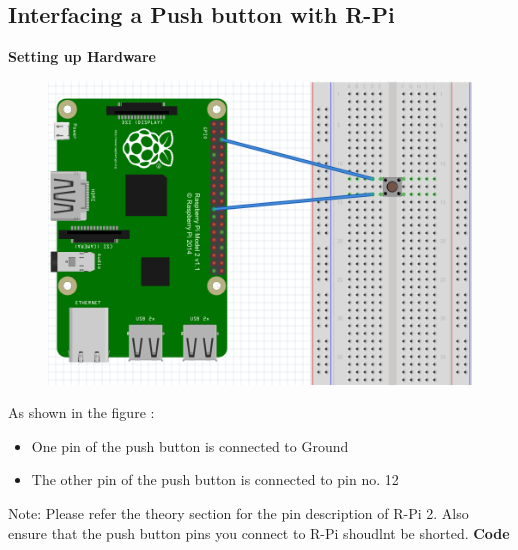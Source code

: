 \documentclass[11pt,a4paper]{article}
\begin{document}
	 \subsection{Interfacing a Push button with R-Pi}
	 \textbf{Setting up Hardware}
	  \begin{figure}[h!]
	  	\includegraphics[scale=0.6]{pb.png}
	  	\centering
	  \end{figure}
	   As shown in the figure :
	   \begin{itemize}
	   	\item One pin of the push button is connected to Ground
	   	\item The other pin of the push button is connected to pin no. 12
	   \end{itemize}
	    Note: Please refer the theory section for the pin description of R-Pi 2. Also ensure that the push button pins you connect to R-Pi shoudlnt be shorted.
	    \vspace{0.3cm}
	    \newline
	    \textbf{Code}
	    
	 
	 \newpage
\end{document}
